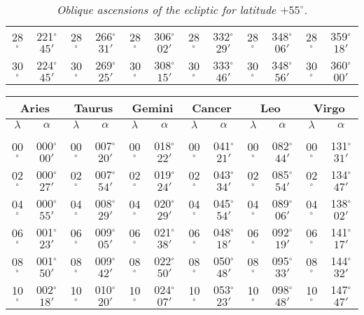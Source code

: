 \begin{table}
{\begin{tabular}{cc|cc|cc|cc|cc|cc}
28$^\circ$ & 221$^\circ$$45'$ & 28$^\circ$ & 266$^\circ$$31'$ & 28$^\circ$ & 306$^\circ$$02'$ & 28$^\circ$ & 332$^\circ$$29'$ &  28$^\circ$ & 348$^\circ$$06'$ & 28$^\circ$ & 359$^\circ$$18'$\\
30$^\circ$ & 224$^\circ$$45'$ & 30$^\circ$ & 269$^\circ$$25'$ & 30$^\circ$ & 308$^\circ$$15'$ & 30$^\circ$ & 333$^\circ$$46'$ &  30$^\circ$ & 348$^\circ$$56'$ & 30$^\circ$ & 360$^\circ$$00'$\\
\end{tabular}}
\caption{\em Oblique ascensions of the ecliptic  for latitude $+55^\circ$.}\label{tzz}
\end{table}

\begin{table}
\centering
{\small \begin{tabular}{cc|cc|cc|cc|cc|cc}
\multicolumn{2}{c}{Aries}\vline & \multicolumn{2}{c}{Taurus} \vline& \multicolumn{2}{c}{Gemini} \vline& \multicolumn{2}{c}{Cancer}\vline &
\multicolumn{2}{c}{Leo}\vline & \multicolumn{2}{c}{Virgo}\\\hline
$\lambda$& $\alpha$& $\lambda$& $\alpha$& $\lambda$& $\alpha$& $\lambda$& $\alpha$& $\lambda$& $\alpha$& $\lambda$& $\alpha$\\\hline
&&&&&&&&&&&\\[-2ex]
00$^\circ$ & 000$^\circ$$00'$ & 00$^\circ$ & 007$^\circ$$20'$ & 00$^\circ$ & 018$^\circ$$22'$ & 00$^\circ$ & 041$^\circ$$21'$ & 00$^\circ$ & 082$^\circ$$44'$ & 00$^\circ$ & 131$^\circ$$31'$\\
02$^\circ$ & 000$^\circ$$27'$ & 02$^\circ$ & 007$^\circ$$54'$ & 02$^\circ$ & 019$^\circ$$24'$ & 02$^\circ$ & 043$^\circ$$34'$ & 02$^\circ$ & 085$^\circ$$54'$ & 02$^\circ$ & 134$^\circ$$47'$\\
04$^\circ$ & 000$^\circ$$55'$ & 04$^\circ$ & 008$^\circ$$29'$ & 04$^\circ$ & 020$^\circ$$29'$ & 04$^\circ$ & 045$^\circ$$54'$ & 04$^\circ$ & 089$^\circ$$06'$ & 04$^\circ$ & 138$^\circ$$02'$\\
06$^\circ$ & 001$^\circ$$23'$ & 06$^\circ$ & 009$^\circ$$05'$ & 06$^\circ$ & 021$^\circ$$38'$ & 06$^\circ$ & 048$^\circ$$18'$ & 06$^\circ$ & 092$^\circ$$19'$ & 06$^\circ$ & 141$^\circ$$17'$\\
08$^\circ$ & 001$^\circ$$50'$ & 08$^\circ$ & 009$^\circ$$42'$ & 08$^\circ$ & 022$^\circ$$50'$ & 08$^\circ$ & 050$^\circ$$48'$ & 08$^\circ$ & 095$^\circ$$33'$ & 08$^\circ$ & 144$^\circ$$32'$\\
10$^\circ$ & 002$^\circ$$18'$ & 10$^\circ$ & 010$^\circ$$20'$ & 10$^\circ$ & 024$^\circ$$07'$ & 10$^\circ$ & 053$^\circ$$23'$ & 10$^\circ$ & 098$^\circ$$48'$ & 10$^\circ$ & 147$^\circ$$47'$\\

\end{tabular}}
\end{table}
